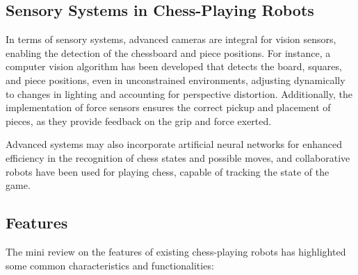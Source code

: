 \documentclass[10pt, a4paper, twocolumn]{article}
\begin{document}
\subsection{Sensory Systems in Chess-Playing Robots}
In terms of sensory systems, advanced cameras are integral for vision sensors, enabling the detection of the chessboard and piece positions. For instance, a computer vision algorithm has been developed that detects the board, squares, and piece positions, even in unconstrained environments, adjusting dynamically to changes in lighting and accounting for perspective distortion\cite{chen2019robust}. Additionally, the implementation of force sensors ensures the correct pickup and placement of pieces, as they provide feedback on the grip and force exerted\cite{omarsdottir2016axiomatic}.

Advanced systems may also incorporate artificial neural networks for enhanced efficiency in the recognition of chess states and possible moves, and collaborative robots have been used for playing chess, capable of tracking the state of the game\cite{kolosowski2020collaborative}.

\subsection{Features}
The mini review on the features of existing chess-playing robots has highlighted some common characteristics and functionalities:
\end{document}
